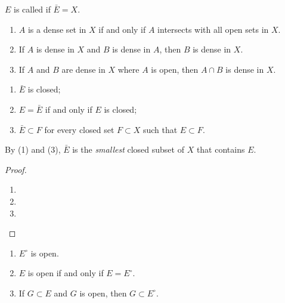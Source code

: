 \begin{definition}
$E$ is called  if $\bar{E}=X$.
\end{definition}

\begin{proposition}
\begin{enumerate}[label=(\arabic*)]
\item $A$ is a dense set in $X$ if and only if $A$ intersects with all open sets in $X$.
\item If $A$ is dense in $X$ and $B$ is dense in $A$, then $B$ is dense in $X$.
\item If $A$ and $B$ are dense in $X$ where $A$ is open, then $A\cap B$ is dense in $X$.
\end{enumerate}
\end{proposition}


\begin{proposition}
\begin{enumerate}[label=(\arabic*)]
\item $\bar{E}$ is closed;
\item $E=\bar{E}$ if and only if $E$ is closed;
\item $\bar{E}\subset F$ for every closed set $F\subset X$ such that $E\subset F$.
\end{enumerate}
By (1) and (3), $\bar{E}$ is the \emph{smallest} closed subset of $X$ that contains $E$.
\end{proposition}

\begin{proof} \
\begin{enumerate}[label=(\arabic*)]
\item 
\item 
\item 
\end{enumerate}
\end{proof}

\begin{proposition}
\begin{enumerate}[label=(\arabic*)]
\item $E^\circ$ is open.
\item $E$ is open if and only if $E=E^\circ$.
\item If $G\subset E$ and $G$ is open, then $G\subset E^\circ$.
\end{enumerate}
\end{proposition}

